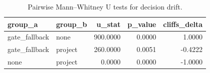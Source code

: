 \begin{table}
\caption{Pairwise Mann–Whitney U tests for decision drift.}
\label{tab:drift_pairwise}
\begin{tabular}{llrrr}
\toprule
group_a & group_b & u_stat & p_value & cliffs_delta \\
\midrule
gate_fallback & none & 900.0000 & 0.0000 & 1.0000 \\
gate_fallback & project & 260.0000 & 0.0051 & -0.4222 \\
none & project & 0.0000 & 0.0000 & -1.0000 \\
\bottomrule
\end{tabular}
\end{table}
